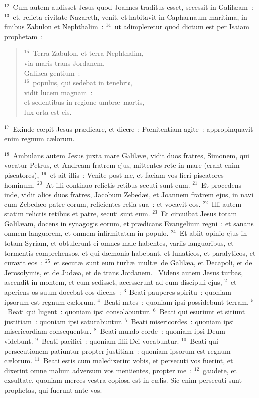 ${}^{12}$~Cum autem audisset Jesus quod Joannes traditus esset, secessit in Galil\ae am~:
${}^{13}$~et, relicta civitate Nazareth, venit, et habitavit in Capharnaum maritima, in finibus Zabulon et Nephthalim~:
${}^{14}$~ut adimpleretur quod dictum est per Isaiam prophetam~:
\begin{flushleft}\begin{verse}${}^{15}$~Terra Zabulon, et terra Nephthalim,\\ via maris trans Jordanem,\\ Galil\ae a gentium~:\\
${}^{16}$~populus, qui sedebat in tenebris,\\ vidit lucem magnam~:\\ et sedentibus in regione umbr\ae\ mortis,\\ lux orta est eis.\end{verse}\end{flushleft}


${}^{17}$~Exinde cœpit Jesus pr\ae dicare, et dicere~: Pœnitentiam agite~: appropinquavit enim regnum c\ae lorum.


${}^{18}$~Ambulans autem Jesus juxta mare Galil\ae \ae , vidit duos fratres, Simonem, qui vocatur Petrus, et Andream fratrem ejus, mittentes rete in mare (erant enim piscatores),
${}^{19}$~et ait illis~: Venite post me, et faciam vos fieri piscatores hominum.
${}^{20}$~At illi continuo relictis retibus secuti sunt eum.
${}^{21}$~Et procedens inde, vidit alios duos fratres, Jacobum Zebed\ae i, et Joannem fratrem ejus, in navi cum Zebed\ae o patre eorum, reficientes retia sua~: et vocavit eos.
${}^{22}$~Illi autem statim relictis retibus et patre, secuti sunt eum.
${}^{23}$~Et circuibat Jesus totam Galil\ae am, docens in synagogis eorum, et pr\ae dicans Evangelium regni~: et sanans omnem languorem, et omnem infirmitatem in populo.
${}^{24}$~Et abiit opinio ejus in totam Syriam, et obtulerunt ei omnes male habentes, variis languoribus, et tormentis comprehensos, et qui d\ae monia habebant, et lunaticos, et paralyticos, et curavit eos~:
${}^{25}$~et secut\ae\ sunt eum turb\ae\ mult\ae\ de Galil\ae a, et Decapoli, et de Jerosolymis, et de Jud\ae a, et de trans Jordanem.
~Videns autem Jesus turbas, ascendit in montem, et cum sedisset, accesserunt ad eum discipuli ejus,
${}^{2}$~et aperiens os suum docebat eos dicens~:
${}^{3}$~Beati pauperes spiritu~: quoniam ipsorum est regnum c\ae lorum.
${}^{4}$~Beati mites~: quoniam ipsi possidebunt terram.
${}^{5}$~Beati qui lugent~: quoniam ipsi consolabuntur.
${}^{6}$~Beati qui esuriunt et sitiunt justitiam~: quoniam ipsi saturabuntur.
${}^{7}$~Beati misericordes~: quoniam ipsi misericordiam consequentur.
${}^{8}$~Beati mundo corde~: quoniam ipsi Deum videbunt.
${}^{9}$~Beati pacifici~: quoniam filii Dei vocabuntur.
${}^{10}$~Beati qui persecutionem patiuntur propter justitiam~: quoniam ipsorum est regnum c\ae lorum.
${}^{11}$~Beati estis cum maledixerint vobis, et persecuti vos fuerint, et dixerint omne malum adversum vos mentientes, propter me~:
${}^{12}$~gaudete, et exsultate, quoniam merces vestra copiosa est in c\ae lis. Sic enim persecuti sunt prophetas, qui fuerunt ante vos.


